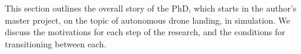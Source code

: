 This section outlines the overall story of the PhD,
which starts in the author's master project,
on the topic of autonomous drone landing, in simulation.
We discuss the motivations for each step of the research,
and the conditions for transitioning between each.

%
